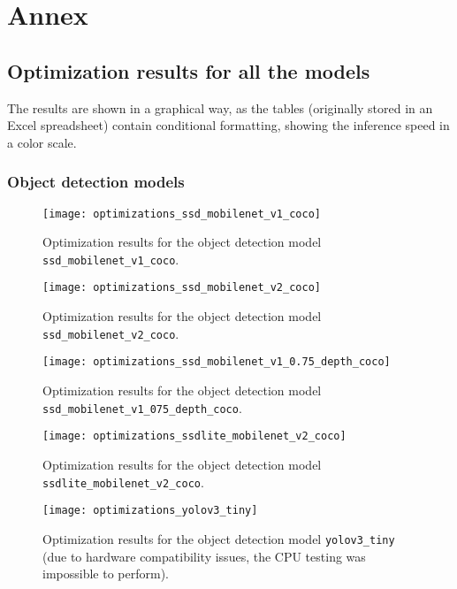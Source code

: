 \chapter* {Annex}
\label{chap:annexes}



\section{Optimization results for all the models}

The results are shown in a graphical way, as the tables (originally stored in an Excel spreadsheet) contain conditional formatting, showing the inference speed in a color scale.

\subsection{Object detection models}

\begin{figure}[h]
	\centering
	\texttt{[image: optimizations\_ssd\_mobilenet\_v1\_coco]}
	\caption{Optimization results for the object detection model \texttt{ssd\_mobilenet\_v1\_coco}.}
\end{figure}

\begin{figure}[h]
	\centering
	\texttt{[image: optimizations\_ssd\_mobilenet\_v2\_coco]}
	\caption{Optimization results for the object detection model \texttt{ssd\_mobilenet\_v2\_coco}.}
\end{figure}

\begin{figure}[h]
	\centering
	\texttt{[image: optimizations\_ssd\_mobilenet\_v1\_0.75\_depth\_coco]}
	\caption{Optimization results for the object detection model \texttt{ssd\_mobilenet\_v1\_0\.75\_depth\_coco}.}
\end{figure}

\begin{figure}[h]
	\centering
	\texttt{[image: optimizations\_ssdlite\_mobilenet\_v2\_coco]}
	\caption{Optimization results for the object detection model \texttt{ssdlite\_mobilenet\_v2\_coco}.}
\end{figure}

\begin{figure}[h]
	\centering
	\texttt{[image: optimizations\_yolov3\_tiny]}
	\caption{Optimization results for the object detection model \texttt{yolov3\_tiny} (due to hardware compatibility issues, the CPU testing was impossible to perform).}
\end{figure}

